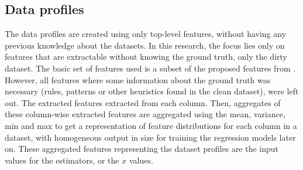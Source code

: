 \subsection{Data profiles}
\label{subsec:dataprofiles}
The data profiles are created using only top-level features, without having any previous knowledge about the datasets. In this research, the focus lies only on features that are extractable without knowing the ground truth, only the dirty dataset. The basic set of features used is a subset of the proposed features from \cite{Mahdavi2019-pk}. However, all features where some information about the ground truth was necessary (rules, patterns or other heuristics found in the clean dataset), were left out. The extracted features extracted from each column. Then, aggregates of these column-wise extracted features are aggregated using the mean, variance, min and max to get a representation of feature distributions for each column in a dataset, with homogeneous output in size for training the regression models later on. These aggregated features representing the dataset profiles are the input values for the estimators, or the $x$ values. 


